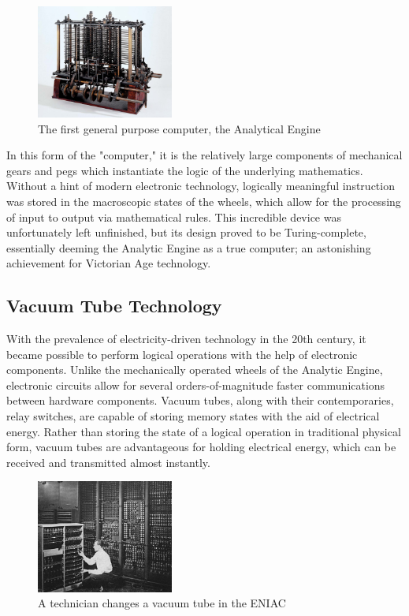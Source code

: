 \documentclass[letterpaper, 10 pt, conference]{IEEEconf}
\begin{document}
\begin{figure}[h!]
\centering
\captionsetup{justification=centering}
\includegraphics[width=0.4\textwidth]{portion-Charles-Babbage-Analytical-Engine-death-mill-1871.jpg}
\caption{The first general purpose computer, the Analytical Engine}
\label{fig:example}
\end{figure} 

In this form of the "computer," it is the relatively large components of mechanical gears and pegs which instantiate the logic of the underlying mathematics. Without a hint of modern electronic technology, logically meaningful instruction was stored in the macroscopic states of the wheels, which allow for the processing of input to output via mathematical rules. This incredible device was unfortunately left unfinished, but its design proved to be Turing-complete, essentially deeming the Analytic Engine as a true computer; an astonishing achievement for Victorian Age technology. 

\subsection{Vacuum Tube Technology}
With the prevalence of electricity-driven technology in the 20th century, it became possible to perform logical operations with the help of electronic components. Unlike the mechanically operated wheels of the Analytic Engine, electronic circuits allow for several orders-of-magnitude faster communications between hardware components. Vacuum tubes, along with their contemporaries, relay switches, are capable of storing memory states with the aid of electrical energy. Rather than storing the state of a logical operation in traditional physical form, vacuum tubes are advantageous for holding electrical energy, which can be received and transmitted almost instantly. 



\begin{figure}[h!]
\centering
\captionsetup{justification=centering}
\includegraphics[width=0.4\textwidth]{ENIAC-changing_a_tube.jpg}
\caption{A technician changes a vacuum tube in the ENIAC}
\label{fig:example}
\end{figure} 
\end{document}
